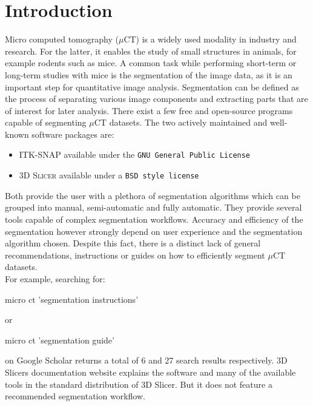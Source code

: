\clearpage
\section{Introduction}
\begin{body}
	Micro computed tomography ($\mu$CT) is a widely used modality in industry and research. For the latter, it enables the study of small structures in animals, for example rodents such as mice\cite{percianoInsight3DMicroCT2017}.
	A common task while performing short-term or long-term studies with mice is the segmentation of the image data, as it is an important step for quantitative image analysis\cite{sheppardTechniquesHelicalScanning2014}. Segmentation can be defined as the process of separating various image components and extracting parts that are of interest for later analysis\cite{percianoInsight3DMicroCT2017}.
	\newline
	There exist a few free and open-source programs capable of segmenting $\mu$CT datasets.
	The two actively maintained and well-known\cite{mandoliniComparisonThree3D2022,virziComprehensiveReview3D2020} software packages are:
	\begin{itemize}
		\item \textsc{ITK-SNAP}\cite{yushkevichUserguided3DActive2006} available under the \texttt{GNU General Public License}\cite{licenseGnuGeneralPublic1989}
		\item \textsc{3D Slicer}\cite{kikinis3DSlicerPlatform2014} available under a \texttt{BSD style license}\cite{gaudeulPublicProvisionPrivate2005}
	\end{itemize}
	Both provide the user with a plethora of segmentation algorithms which can be grouped into manual, semi-automatic and fully automatic. They provide several tools capable of complex segmentation workflows\cite{percianoInsight3DMicroCT2017}.
	Accuracy and efficiency of the segmentation however strongly depend on user experience and the segmentation algorithm chosen\cite{mandoliniComparisonThree3D2022,aydinRELIABILITYREPRODUCIBILITYTIMEEFFICIENCY2020}. Despite this fact, there is a distinct lack of general recommendations, instructions or guides on how to efficiently segment $\mu$CT datasets.\\
	For example, searching for:
	\begin{displayquote}
	  micro ct 'segmentation instructions'
    \end{displayquote}
	or
    \begin{displayquote}
	  micro ct 'segmentation guide'
    \end{displayquote}
	on Google Scholar returns a total of 6 and 27 search results respectively.
	3D Slicers documentation website\cite{pinterPolymorphSegmentationRepresentation2019} explains the software and many of the available tools in the standard distribution of 3D Slicer. But it does not feature a recommended segmentation workflow.
  \end{body}
